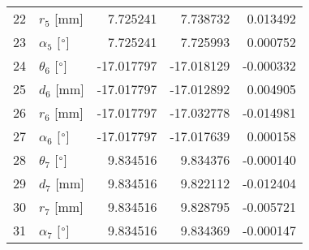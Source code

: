 \documentclass{standalone}%
\begin{document}
\begin{tabular}{llrrr}
22 &              $r_{5}$ [mm] &   7.725241 &   7.738732 &   0.013492 \\
23 &  $\alpha_{5}$ [$\degree$] &   7.725241 &   7.725993 &   0.000752 \\
24 &  $\theta_{6}$ [$\degree$] & -17.017797 & -17.018129 &  -0.000332 \\
25 &              $d_{6}$ [mm] & -17.017797 & -17.012892 &   0.004905 \\
26 &              $r_{6}$ [mm] & -17.017797 & -17.032778 &  -0.014981 \\
27 &  $\alpha_{6}$ [$\degree$] & -17.017797 & -17.017639 &   0.000158 \\
28 &  $\theta_{7}$ [$\degree$] &   9.834516 &   9.834376 &  -0.000140 \\
29 &              $d_{7}$ [mm] &   9.834516 &   9.822112 &  -0.012404 \\
30 &              $r_{7}$ [mm] &   9.834516 &   9.828795 &  -0.005721 \\
31 &  $\alpha_{7}$ [$\degree$] &   9.834516 &   9.834369 &  -0.000147 \\
\bottomrule
\end{tabular}
%
\end{document}
